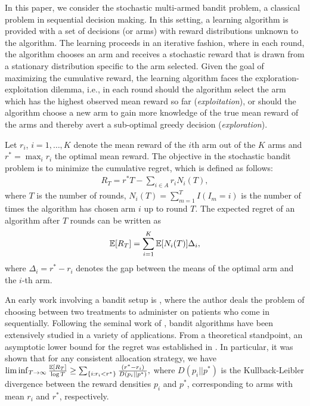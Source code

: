 In this paper, we consider the stochastic multi-armed bandit problem, a classical problem in sequential decision making. In this setting,  a learning algorithm is provided with a set of decisions (or arms) with reward distributions unknown to the algorithm. The learning proceeds in an iterative fashion, where in each round, the algorithm chooses an arm and receives a stochastic reward that is drawn from a stationary distribution specific to the arm selected.  
Given the goal of maximizing the cumulative reward, the learning algorithm faces the exploration-exploitation dilemma, i.e., in each round should the algorithm select the arm which has the highest observed mean reward so far 
(\textit{exploitation}), or should the algorithm choose a new arm to gain more knowledge of the true mean reward of the arms and thereby avert a sub-optimal greedy decision (\textit{exploration}). 

Let $r_i$, $i=1,\ldots,K$ denote the mean reward of the $i$th arm out of the $K$ arms and $r^* = \max_i r_i$ the optimal mean reward. The objective in the stochastic bandit problem is to minimize the cumulative regret, which is defined as follows:
\begin{align*}
R_{T}=r^{*}T - \sum_{i\in A} r_{i}N_{i}(T),
\end{align*}
where $T$ is the number of rounds, $N_{i}(T)=\sum_{m=1}^T I(I_m=i)$ is the number of times the algorithm has chosen arm $i$ up to round $T$.
The expected regret of an algorithm after $T$ rounds can be written as
\begin{align*}
\mathbb{E}[R_{T}]= \sum_{i=1}^K \mathbb{E}[N_i(T)] \Delta_i,
\end{align*}
where $\Delta_{i}=r^{*}-r_{i}$ denotes the gap between the means of the optimal arm and the $i$-th arm. 


                                                                                                                                          


An early work involving a bandit setup is \citet{thompson1933likelihood}, where the author deals the problem of choosing between two treatments to administer on patients who come in sequentially. Following the seminal work of \citet{robbins1952some}, bandit algorithms have been extensively studied in a variety of applications. 
From a theoretical standpoint, an asymptotic lower bound for the regret was established in \citet{lai1985asymptotically}. In particular, it was shown that for any consistent allocation strategy, we have
$\liminf_{T \to \infty}\frac{\mathbb{E}[R_{T}]}{\log T}\geq\sum_{\{i:r_{i}<r^{*}\}}\frac{(r^{*}-r_{i})}{D(p_{i}||p^{*})},$
where $D(p_{i}||p^{*})$ is the Kullback-Leibler divergence between the reward densities $p_{i}$ and $p^{*}$, corresponding to arms with mean $r_{i}$ and $r^{*}$, respectively.

